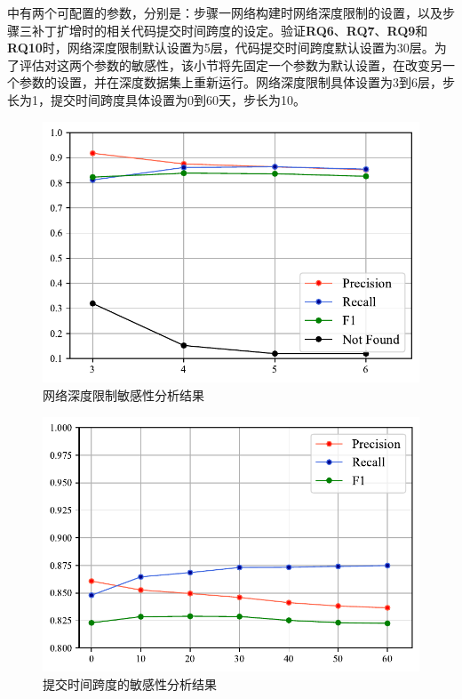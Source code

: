 \tool 中有两个可配置的参数，分别是：\tool 步骤一网络构建时网络深度限制的设置，以及步骤三补丁扩增时的相关代码提交时间跨度的设定。验证\textbf{RQ6}、\textbf{RQ7}、\textbf{RQ9}和\textbf{RQ10}时，网络深度限制默认设置为5层，代码提交时间跨度默认设置为30层。为了评估\tool 对这两个参数的敏感性，该小节将先固定一个参数为默认设置，在改变另一个参数的设置，并在深度数据集上重新运行\tool 。网络深度限制具体设置为3到6层，步长为1，提交时间跨度具体设置为0到60天，步长为10。
\begin{figure}[h]
    \centering
    \includegraphics[scale=0.88]{res/rq8-sensitivity-depth.pdf}
    \caption{网络深度限制敏感性分析结果}\label{fig:depth}
\end{figure}

\begin{figure}[h]
    \centering
    \includegraphics[scale=0.88]{res/rq8-sensitivity-span.pdf}
    \caption{提交时间跨度的敏感性分析结果}\label{fig:span}
\end{figure}


